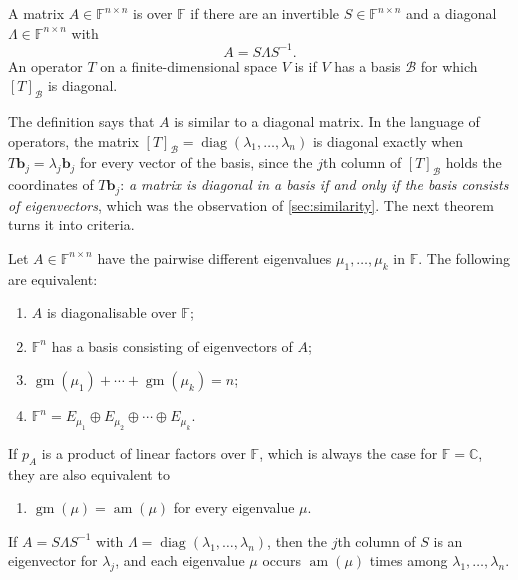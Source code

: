 \begin{definition}
\label{def:diagonalisable}
A matrix $A\in\mathbb F^{n\times n}$ is  over $\mathbb F$ if there are an invertible $S\in\mathbb F^{n\times n}$ and a diagonal $\Lambda\in\mathbb F^{n\times n}$ with
\[
A=S\Lambda S^{-1}.
\]
An operator $T$ on a finite-dimensional space $V$ is  if $V$ has a basis $\mathcal B$ for which $[T]_{\mathcal B}$ is diagonal.
\end{definition}

The definition says that $A$ is similar to a diagonal matrix. In the language of operators, the matrix $[T]_{\mathcal B}=\operatorname{diag}(\lambda_1,\ldots,\lambda_n)$ is diagonal exactly when $T\mathbf b_j=\lambda_j\mathbf b_j$ for every vector of the basis, since the $j$th column of $[T]_{\mathcal B}$ holds the coordinates of $T\mathbf b_j$: \emph{a matrix is diagonal in a basis if and only if the basis consists of eigenvectors}, which was the observation of \cref{sec:similarity}. The next theorem turns it into criteria.

\begin{theorem}
\label{thm:diagonalisable}
Let $A\in\mathbb F^{n\times n}$ have the pairwise different eigenvalues $\mu_1,\ldots,\mu_k$ in $\mathbb F$. The following are equivalent:
\begin{enumerate}
\item $A$ is diagonalisable over $\mathbb F$;
\item $\mathbb F^n$ has a basis consisting of eigenvectors of $A$;
\item $\operatorname{gm}(\mu_1)+\cdots+\operatorname{gm}(\mu_k)=n$;
\item $\mathbb F^n=E_{\mu_1}\oplus E_{\mu_2}\oplus\cdots\oplus E_{\mu_k}$.
\end{enumerate}
If $p_A$ is a product of linear factors over $\mathbb F$, which is always the case for $\mathbb F=\mathbb C$, they are also equivalent to
\begin{enumerate}[start=5]
\item $\operatorname{gm}(\mu)=\operatorname{am}(\mu)$ for every eigenvalue $\mu$.
\end{enumerate}
If $A=S\Lambda S^{-1}$ with $\Lambda=\operatorname{diag}(\lambda_1,\ldots,\lambda_n)$, then the $j$th column of $S$ is an eigenvector for $\lambda_j$, and each eigenvalue $\mu$ occurs $\operatorname{am}(\mu)$ times among $\lambda_1,\ldots,\lambda_n$.
\end{theorem}

